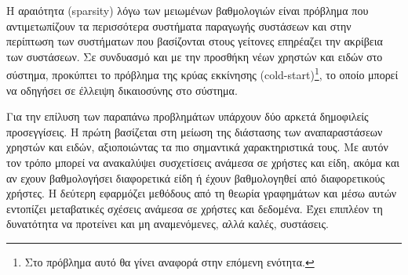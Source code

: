 Η αραιότητα ({\en sparsity}) λόγω των μειωμένων βαθμολογιών είναι πρόβλημα που αντιμετωπίζουν τα περισσότερα συστήματα παραγωγής συστάσεων και στην περίπτωση των συστήματων που βασίζονται στους γείτονες επηρέαζει την ακρίβεια των συστάσεων. Σε συνδυασμό και με την προσθήκη νέων χρηστών και ειδών στο σύστημα, προκύπτει το πρόβλημα της κρύας εκκίνησης ({\en cold-start})\footnote{Στο πρόβλημα αυτό θα γίνει αναφορά στην επόμενη ενότητα.}, το οποίο μπορεί να οδηγήσει σε έλλειψη δικαιοσύνης στο σύστημα.\par
Για την επίλυση των παραπάνω προβλημάτων υπάρχουν δύο αρκετά δημοφιλείς προσεγγίσεις. Η πρώτη βασίζεται στη μείωση της διάστασης των αναπαραστάσεων χρηστών και ειδών, αξιοποιώντας τα πιο σημαντικά χαρακτηριστικά τους. Με αυτόν τον τρόπο μπορεί να ανακαλύψει συσχετίσεις ανάμεσα σε χρήστες και είδη, ακόμα και αν εχουν βαθμολογήσει διαφορετικά είδη ή έχουν βαθμολογηθεί από διαφορετικούς χρήστες. Η δεύτερη εφαρμόζει μεθόδους από τη θεωρία γραφημάτων και μέσω αυτών εντοπίζει μεταβατικές σχέσεις ανάμεσα σε χρήστες και δεδομένα. Έχει επιπλέον τη δυνατότητα να προτείνει και μη αναμενόμενες, αλλά καλές, συστάσεις.
